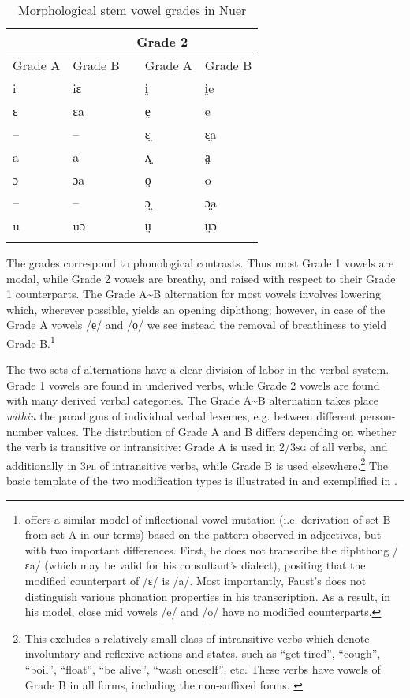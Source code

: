 \documentclass[output=paper,newtxmath,modfonts,nonflat,draftmode]{langsci/langscibook}
\begin{document}
\begin{table}
\begin{tabularx}{.8\textwidth}{llXll}
\lsptoprule

\multicolumn{2}{c}{Grade 1} && \multicolumn{2}{c}{Grade 2}\\
\midrule
  Grade A &  Grade B &&  Grade A &  Grade B\\
 i & iɛ && i̤ & i̤e\\
 ɛ & ɛa && e̤ & e\\
 -- & -- && ɛ̤ & ɛ̤a\\
 a & a && ʌ̤ & a̤\\
 ɔ & ɔa && o̤ & o\\
 -- & -- && ɔ̤ & ɔ̤a\\
 u & uɔ && ṳ & ṳɔ\\
\lspbottomrule
\end{tabularx}
\caption{Morphological stem vowel grades in Nuer}
\label{tab:monich:4}
\end{table}

\newpage 
The grades correspond to phonological contrasts. Thus most Grade 1 vowels are modal, while Grade 2 vowels are breathy, and raised with respect to their Grade 1 counterparts. The Grade A{\textasciitilde}B alternation for most vowels involves lowering which, wherever possible, yields an opening diphthong; however, in case of the Grade A vowels /e̤/ and /o̤/ we see instead the removal of breathiness to yield Grade B.\footnote{\citet{Faust2017} offers\label{fn:monich:4} a similar model of inflectional vowel mutation (i.e. derivation of set B from set A in our terms) based on the pattern observed in adjectives, but with two important differences. First, he does not transcribe the diphthong /ɛa/ (which may be valid for his consultant’s dialect), positing that the modified counterpart of /ɛ/ is /a/. Most importantly, Faust’s does not distinguish various phonation properties in his transcription. As a result, in his model, close mid vowels /e/ and /o/ have no modified counterparts.}  

The two sets of alternations have a clear division of labor in the verbal system. Grade 1 vowels are found in underived verbs, while Grade 2 vowels are found with many derived verbal categories. The Grade A{\textasciitilde}B alternation takes place \textit{within} the paradigms of individual verbal lexemes, e.g. between different  person-number values. The distribution of Grade A and B differs depending on whether the verb is transitive or intransitive: Grade A is used in 2/3\textsc{sg} of all verbs, and additionally in 3\textsc{pl} of intransitive verbs, while Grade B is used elsewhere.\footnote{This excludes a relatively small class of intransitive verbs which denote involuntary and reflexive actions and states, such as “get tired”, “cough”, “boil”, “float”, “be alive”, “wash oneself”, etc. These verbs have vowels of Grade B in all forms, including the non-suffixed forms. \label{fn:monich:5} }  The basic template of the two  modification types is illustrated in  and exemplified in . 
\end{document}
